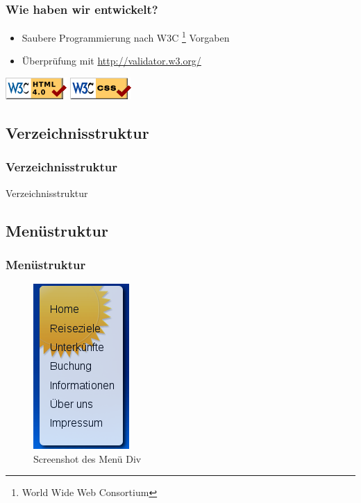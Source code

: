 \documentclass[xcolor=dvipsnames]{beamer}
\begin{document}
\begin{frame} %
  \frametitle{Wie haben wir entwickelt?} %
  \begin{block}{}
	  \begin{itemize}
		\item Saubere Programmierung nach W3C \footnote{World Wide Web Consortium} Vorgaben
		\item Überprüfung mit \url{http://validator.w3.org/}
	  \end{itemize}
  \end{block}
  \center
  \includegraphics[scale=0.5]{valid-html40.png}
  \includegraphics[scale=0.5]{vcss.png}

\end{frame}


\subsection{Verzeichnisstruktur}
\begin{frame} %
  \frametitle{Verzeichnisstruktur} %
  \begin{block}{Verzeichnisstruktur}
  \end{block}
\end{frame}

\subsection{Menüstruktur}
\begin{frame} %
  \frametitle{Menüstruktur} %
	\begin{figure}
	\includegraphics[scale=0.8]{screenshot_menue.png}
	\caption{Screenshot des Menü Div}
	\end{figure}
\end{frame}
\end{document}

